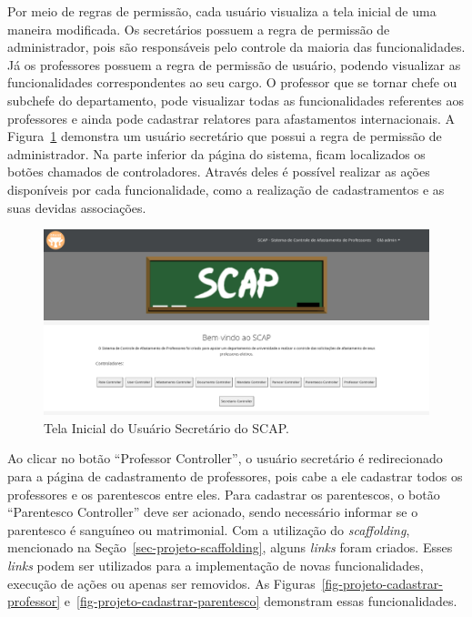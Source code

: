 Por meio de regras de permissão, cada usuário visualiza a tela inicial de uma maneira modificada. Os secretários possuem a regra de permissão de administrador, pois são responsáveis pelo controle da maioria das funcionalidades. Já os professores possuem a regra de permissão de usuário, podendo visualizar as funcionalidades correspondentes ao seu cargo. O professor que se tornar chefe ou subchefe do departamento, pode visualizar todas as funcionalidades referentes aos professores e ainda pode cadastrar relatores para afastamentos internacionais. A Figura~\ref{fig-projeto-usuario-secretario} demonstra um usuário secretário que possui a regra de permissão de administrador. Na parte inferior da página do sistema, ficam localizados os botões chamados de controladores. Através deles é possível realizar as ações disponíveis por cada funcionalidade, como a realização de cadastramentos e as suas devidas associações. 

\begin{figure}[!h]
	\centering
	\includegraphics[scale=0.33]{figuras/fig-projeto-usuario-secretario} 
	\caption{Tela Inicial do Usuário Secretário do SCAP.}
	\label{fig-projeto-usuario-secretario}
\end{figure}

Ao clicar no botão ``Professor Controller'', o usuário secretário é redirecionado para a página de cadastramento de professores, pois cabe a ele cadastrar todos os professores e os parentescos entre eles. Para cadastrar os parentescos, o botão ``Parentesco Controller'' deve ser acionado, sendo necessário informar se o parentesco é sanguíneo ou matrimonial. Com a utilização do \textit{scaffolding}, mencionado na Seção~\ref{sec-projeto-scaffolding}, alguns \textit{links} foram criados. Esses \textit{links} podem ser utilizados para a implementação de novas funcionalidades, execução de ações ou apenas ser removidos. As Figuras~\ref{fig-projeto-cadastrar-professor} e~\ref{fig-projeto-cadastrar-parentesco} demonstram essas funcionalidades.

